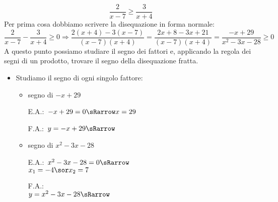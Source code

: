\begin{esempio}
 \[\frac{2}{x-7} \ge \frac{3}{x+4}\]
Per prima cosa dobbiamo scrivere la disequazione in forma normale:
 \[\frac{2}{x-7} - \frac{3}{x+4} \ge 0 \Rightarrow 
   \frac{2(x+4) - 3(x-7)}{(x-7)(x+4)} = 
   \frac{2 x +8 -3x +21}{(x-7)(x+4)} =
   \frac{-x +29}{x^2-3x-28} \ge 0\]
A questo punto possiamo studiare il segno dei fattori e, applicando la regola 
dei segni di un prodotto, trovare il segno della disequazione fratta.

\begin{itemize}
 \item Studiamo il segno di ogni singolo fattore:

\begin{itemize}

 \item  segno di \(-x +29\)\\
 \begin{minipage}{.35\textwidth}
  E.A.:~\(-x +29=0 \sRarrow x=29\)
  \vspace{1.8em}
 \end{minipage}
 \begin{minipage}{.25\textwidth}
  F.A.:~\(y=-x +29 \sRarrow \)
  \vspace{1.8em}
 \end{minipage}
 \begin{minipage}{.38\textwidth}
  \begin{inaccessibleblock}
\end{inaccessibleblock}
 \end{minipage}
 
 \item segno di \(x^2-3x-28\)\\
 \begin{minipage}{.35\textwidth}
  E.A.:~\(x^2-3x-28=0 \sRarrow \) \\
  \(x_1=-4 \sor x_2=7\)
 \end{minipage}
 \begin{minipage}{.25\textwidth}
  F.A.:\\
  \(y=x^2-3x-28 \sRarrow\)
 \end{minipage}
 \begin{minipage}{.38\textwidth}
  \begin{inaccessibleblock}
\end{inaccessibleblock}
 \end{minipage}
 

\end{itemize}
\end{itemize}
\end{esempio}

